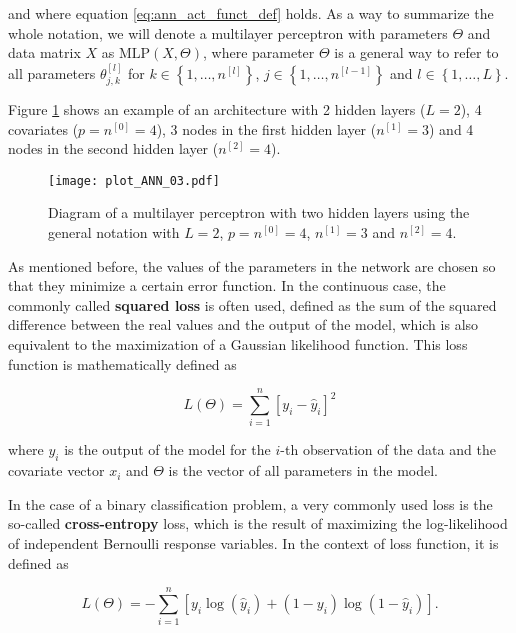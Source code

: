 and where equation \ref{eq:ann_act_funct_def} holds. As a way to summarize the whole notation, we will denote a multilayer perceptron with parameters $\Theta$ and data matrix $X$ as $\mathrm{MLP} \left(X, \Theta \right)$, where parameter $\Theta$ is a general way to refer to all parameters $\theta_{j,k}^{[l]}$ for $k \in \left\{ 1, \ldots, n^{[l]} \right\}$, $j \in \left\{ 1, \ldots, n^{[l-1]} \right\}$ and $l \in \left\{ 1, \ldots, L \right\}$.

Figure \ref{fig:theory_ANN_diagram_03} shows an example of an architecture with 2 hidden layers ($L = 2$), 4 covariates ($p = n^{[0]} = 4$), 3 nodes in the first hidden layer ($n^{[1]} = 3$) and 4 nodes in the second hidden layer ($n^{[2]} = 4$).

\begin{figure}[H]
    \centering
    \texttt{[image: plot\_ANN\_03.pdf]}
    \caption{Diagram of a multilayer perceptron with two hidden layers using the general notation with $L = 2$, $p = n^{[0]} = 4$, $n^{[1]} = 3$ and $n^{[2]} = 4$.}
    \label{fig:theory_ANN_diagram_03}
\end{figure}

As mentioned before, the values of the parameters in the network are chosen so that they minimize a certain error function. In the continuous case, the commonly called \textbf{squared loss} is often used, defined as the sum of the squared difference between the real values and the output of the model, which is also equivalent to the maximization of a Gaussian likelihood function. This loss function is mathematically defined as

\begin{equation*}
  L(\Theta) = \sum_{i = 1}^n \left[ y_i - \hat{y}_i \right]^2
\end{equation*}

where $\hat{y_i}$ is the output of the model for the $i$-th observation of the data and the covariate vector $x_i$ and $\Theta$ is the vector of all parameters in the model.

In the case of a binary classification problem, a very commonly used loss is the so-called \textbf{cross-entropy} loss, which is the result of maximizing the log-likelihood of independent Bernoulli response variables. In the context of loss function, it is defined as

\begin{equation}
  \label{eq:binary_cross_entropy_loss}
  L(\Theta) = - \sum_{i = 1}^n \left[ y_i \log{\left( \hat{y}_i \right)} + (1 - y_i) \log{\left( 1 - \hat{y}_i \right)} \right].
\end{equation}

